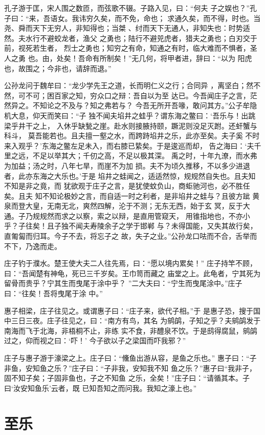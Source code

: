 \documentclass[12pt,UTF8]{ctexbook}
\begin{document}
孔子游于匡，宋人围之数匝，而弦歌不辍。子路入见，曰：“何夫 子之娱也？”孔子曰：“来，吾语女。我讳穷久矣，而不免，命也； 求通久矣，而不得，时也。当尧、舜而天下无穷人，非知得也；当桀 、纣而天下无通人，非知失也：时势适然。夫水行不避蛟龙者，渔父 之勇也；陆行不避兕虎者，猎夫之勇也；白刃交于前，视死若生者， 烈士之勇也；知穷之有命，知通之有时，临大难而不惧者，圣人之勇 也。由，处矣！吾命有所制矣！”无几何，将甲者进，辞曰：“以为 阳虎也，故围之；今非也，请辞而退。”

公孙龙问于魏牟曰：“龙少学先王之道，长而明仁义之行；合同异 ，离坚白；然不然，可不可；困百家之知，穷众口之辩：吾自以为至 达已。今吾闻庄子之言，茫然异之。不知论之不及与？知之弗若与？ 今吾无所开吾喙，敢问其方。”公子牟隐机大息，仰天而笑曰：“子 独不闻夫埳井之蛙乎？谓东海之鳖曰：‘吾乐与！出跳梁乎井干之上， 入休乎缺甃之崖。赴水则接腋持颐，蹶泥则没足灭跗。还虷蟹与科斗， 莫吾能若也。且夫擅一壑之水，而跨跱埳井之乐，此亦至矣。夫子奚 不时来入观乎？’东海之鳖左足未入，而右膝已絷矣。于是逡巡而却， 告之海曰：‘夫千里之远，不足以举其大；千仞之高，不足以极其深。 禹之时，十年九潦，而水弗为加益；汤之时，八年七旱，而崖不为加 损。夫不为顷久推移，不以多少进退者，此亦东海之大乐也。’于是 埳井之蛙闻之，适适然惊，规规然自失也。且夫知不知是非之竟，而 犹欲观于庄子之言，是犹使蚊负山，商蚷驰河也，必不胜任矣。且夫 知不知论极妙之言，而自适一时之利者，是非埳井之蛙与？且彼方跐 黄泉而登大皇，无南无北，爽然四解，沦于不测；无东无西，始于玄 冥，反于大通。子乃规规然而求之以察，索之以辩，是直用管窥天， 用锥指地也，不亦小乎？子往矣！且子独不闻夫寿陵余子之学于邯郸 与？未得国能，又失其故行矣，直匍匐而归耳。今子不去，将忘子之 故，失子之业。”公孙龙口呿而不合，舌举而不下，乃逸而走。

庄子钓于濮水。楚王使大夫二人往先焉，曰：“愿以境内累矣！” 庄子持竿不顾，曰：“吾闻楚有神龟，死已三千岁矣。王巾笥而藏之 庙堂之上。此龟者，宁其死为留骨而贵乎？宁其生而曳尾于涂中乎？ ”二大夫曰：“宁生而曳尾涂中。”庄子曰：“往矣！吾将曳尾于涂 中。”

惠子相梁，庄子往见之。或谓惠子曰：“庄子来，欲代子相。”于 是惠子恐，搜于国中三日三夜。庄子往见之，曰：“南方有鸟，其名 为鹓鹐，子知之乎？夫鹓鹐发于南海而飞于北海，非梧桐不止，非练 实不食，非醴泉不饮。于是鸱得腐鼠，鹓鹐过之，仰而视之曰：‘吓！’ 今子欲以子之梁国而吓我邪？”

庄子与惠子游于濠梁之上。庄子曰：“儵鱼出游从容，是鱼之乐也。” 惠子曰∶“子非鱼，安知鱼之乐？”庄子曰：“子非我，安知我不知 鱼之乐？”惠子曰“我非子，固不知子矣；子固非鱼也，子之不知鱼 之乐，全矣！”庄子曰：“请循其本。子曰‘汝安知鱼乐’云者，既 已知吾知之而问我。我知之濠上也。”
\section{至乐}
\end{document}
